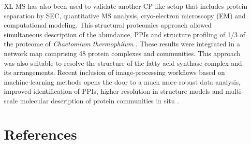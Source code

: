 XL-MS has also been used to validate another CP-like setup that includes protein separation by SEC, quantitative MS analysis, cryo-electron microscopy (EM) and computational modeling. This structural proteomics approach allowed simultaneous description of the abundance, PPIs and structure profiling of 1/3 of the proteome of \emph{Chaetomium thermophilum} \cite{Kastritis_2017}. These results were integrated in a network map comprising 48 protein complexes and communities. This approach was also suitable to resolve the structure of the fatty acid synthase complex and its arrangements. Recent inclusion of image-processing workflows based on machine-learning methods opens the door to a much more robust data analysis, improved identification of PPIs, higher resolution in structure models and multi-scale molecular description of protein communities in situ \cite{Kyrilis_2021a}.

\newpage
\section*{References}



